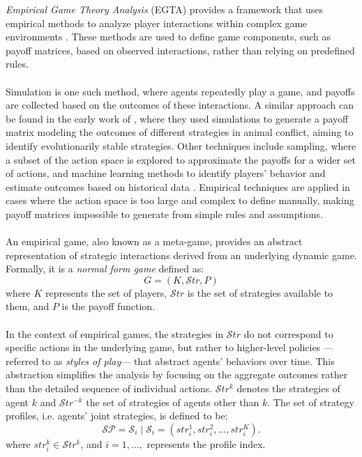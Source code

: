 \begin{flushleft}

    \emph{Empirical Game Theory Analysis} (EGTA) provides a framework that uses empirical methods to analyze player interactions within complex game environments \cite{Levet2016GameT}. These methods are used to define game components, such as payoff matrices, based on observed interactions, rather than relying on predefined rules.\\~\\ 
    
    Simulation is one such method, where agents repeatedly play a game, and payoffs are collected based on the outcomes of these interactions. A similar approach can be found in the early work of \cite{SMITH1973}, where they used simulations to generate a payoff matrix modeling the outcomes of different strategies in animal conflict, aiming to identify evolutionarily stable strategies. Other techniques include sampling, where a subset of the action space is explored to approximate the payoffs for a wider set of actions, and machine learning methods to identify players' behavior and estimate outcomes based on historical data \cite{wellman2024empiricalgametheoreticanalysissurvey}. Empirical techniques are applied in cases where the action space is too large and complex to define manually, making payoff matrices impossible to generate from simple rules and assumptions.\\~\\

    An empirical game, also known as a meta-game, provides an abstract representation of strategic interactions derived from an underlying dynamic game. Formally, it is a \emph{normal form game} defined as:
    \begin{equation}
        G = (K, \mathcal{S}tr, P)
        \label{eq:nfg}
    \end{equation}        
    where $K$ represents the set of players, $\mathcal{S}tr$ is the set of strategies available to them, and $P$ is the payoff function.\\~\\
    
    In the context of empirical games, the strategies in $\mathcal{S}tr$ do not correspond to specific actions in the underlying game, but rather to higher-level policies —referred to as \emph{styles of play}— that abstract agents' behaviors over time. This abstraction simplifies the analysis by focusing on the aggregate outcomes rather than the detailed sequence of individual actions. $\mathcal{S}tr^k$ denotes the strategies of agent $k$ and $\mathcal{S}tr^{-k}$ the set of strategies of agents other than $k$. The set of strategy profiles, i.e. agents' joint strategies, is defined to be:
    \begin{equation}
        \mathcal{SP} = \mathcal{S}_i \mid \mathcal{S}_i = (str_i^1, str_i^2, \dots, str_i^K).
        \label{eq:strategy_profiles}
    \end{equation}
    where $str_i^k \in \mathcal{S}tr^k$, and $i = 1, \dots,$ represents the profile index.\\~\\
    

\end{flushleft}
